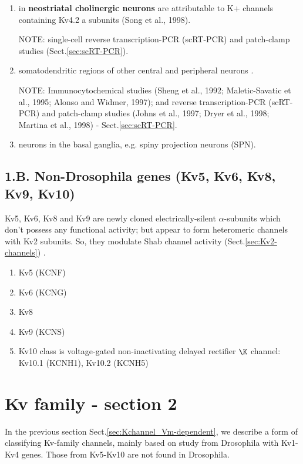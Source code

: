 \begin{enumerate}

  \item in {\bf neostriatal cholinergic neurons} are
  attributable to K+ channels containing Kv4.2 a subunits (Song et al., 1998).

NOTE: single-cell reverse transcription-PCR (scRT-PCR) and patch-clamp studies
(Sect.\ref{sec:scRT-PCR}).

  \item somatodendritic regions of other central and peripheral neurons . 

NOTE: Immunocytochemical studies (Sheng et al., 1992; Maletic-Savatic et al., 1995;
Alonso and Widmer, 1997); and reverse transcription-PCR (scRT-PCR) and
patch-clamp studies (Johns et al., 1997; Dryer et al., 1998; Martina et al.,
1998) - Sect.\ref{sec:scRT-PCR}.

  \item neurons in the basal ganglia, e.g. spiny projection neurons (SPN).
  
\end{enumerate}
   
\subsection{1.B. Non-Drosophila genes (Kv5, Kv6, Kv8, Kv9, Kv10)}
\label{sec:Kv-non-Drosophila}


Kv5, Kv6, Kv8 and Kv9 are newly cloned electrically-silent $\alpha$-subunits
which don't possess any functional activity; but appear to form heteromeric
channels with Kv2 subunits. So, they modulate Shab channel activity
(Sect.\ref{sec:Kv2-channels}) \citep{salinas1997}.
\begin{enumerate}
   \item Kv5 (KCNF)
   \item Kv6 (KCNG)
   \item Kv8 
   \item Kv9 (KCNS)
   \item Kv10 class is voltage-gated non-inactivating delayed rectifier $\K$
   channel: Kv10.1 (KCNH1), Kv10.2 (KCNH5)
\end{enumerate}


\section{Kv family - section 2}
\label{sec:Kv_channel}

In the previous section Sect.\ref{sec:Kchannel_Vm-dependent}, we describe a form
of classifying Kv-family channels, mainly based on study from Drosophila with
Kv1-Kv4 genes. Those from Kv5-Kv10 are not found in Drosophila.


